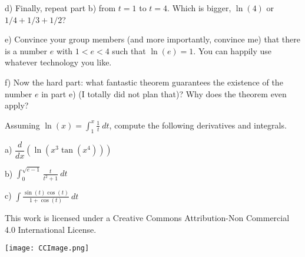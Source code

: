 \documentclass[12pt]{article}
\newcommand{\numb}[1]{\noindent{\bf #1)}}
\begin{document}
d) Finally, repeat part b) from $t=1$ to $t=4$. Which is bigger, $\ln(4)$ or $1/4+1/3+1/2$?

\bigskip

e) Convince your group members (and more importantly, convince me) that there is a number $e$ with $1<e<4$ such that $\ln(e)=1$. You can happily use whatever technology you like.

\bigskip

f) Now the hard part: what fantastic theorem guarantees the existence of the number $e$ in part e) (I totally did not plan that)? Why does the theorem even apply?

\newpage

\numb{3} Assuming $\ln(x)=\displaystyle\int^x_1 \frac 1 t \ dt$, compute the following derivatives and integrals.

\bigskip

a) $\dfrac d {dx}(\ln(x^3\tan(x^4)))$ 

\bigskip

b)  $\displaystyle\int_0^{\sqrt{e-1}} \frac t {t^2+1} \ dt$

\bigskip

c) $\displaystyle\int \frac {\sin(t)\cos(t)}{1+\cos(t)} \ dt$

\newpage

\begin{mdframed}[outerlinecolor=black,outerlinewidth=2pt,linecolor=cccolor,middlelinewidth=3pt,roundcorner=10pt]
  This work is licensed under a Creative Commons Attribution-Non Commercial 4.0 International License.
  \begin{center}
    \texttt{[image: CCImage.png]}
  \end{center}
\end{mdframed}
\end{document}
